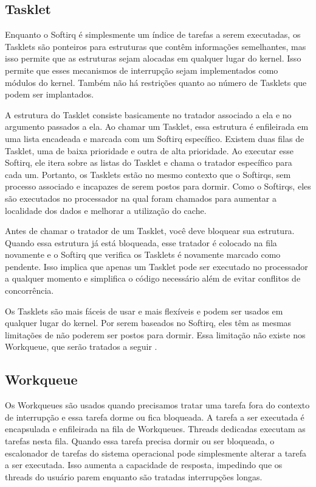 \subsection{Tasklet}

Enquanto o Softirq é simplesmente um índice de tarefas a serem executadas, os Tasklets são ponteiros para estruturas que contêm informações semelhantes, mas isso permite que as estruturas sejam alocadas em qualquer lugar do kernel. Isso permite que esses mecanismos de interrupção sejam implementados como módulos do kernel. Também não há restrições quanto ao número de Tasklets que podem ser implantados.

A estrutura do Tasklet consiste basicamente no tratador associado a ela e no argumento passados a ela. Ao chamar um Tasklet, essa estrutura é enfileirada em uma lista encadeada e marcada com um Softirq específico. Existem duas filas de Tasklet, uma de baixa prioridade e outra de alta prioridade. Ao executar esse Softirq, ele itera sobre as listas do Tasklet e chama o tratador específico para cada um. Portanto, os Tasklets estão no mesmo contexto que o Softirqs, sem processo associado e incapazes de serem postos para dormir. Como o Softirqs, eles são executados no processador na qual foram chamados para aumentar a localidade dos dados e melhorar a utilização do cache.

Antes de chamar o tratador de um Tasklet, você deve bloquear sua estrutura. Quando essa estrutura já está bloqueada, esse tratador é colocado na fila novamente e o Softirq que verifica os Tasklets é novamente marcado como pendente. Isso implica que apenas um Tasklet pode ser executado no processador a qualquer momento e simplifica o código necessário além de evitar conflitos de concorrência.

Os Tasklets são mais fáceis de usar e mais flexíveis e podem ser usados em qualquer lugar do kernel. Por serem baseados no Softirq, eles têm as mesmas limitações de não poderem ser postos para dormir. Essa limitação não existe nos Workqueue, que serão tratados a seguir \cite{OReilly, Rothberg2015}.

\subsection{Workqueue}

Os Workqueues são usados quando precisamos tratar uma tarefa fora do contexto de interrupção e essa tarefa dorme ou fica bloqueada. A tarefa a ser executada é encapsulada e enfileirada na fila de Workqueues. Threads dedicadas executam as tarefas nesta fila. Quando essa tarefa precisa dormir ou ser bloqueada, o escalonador de tarefas do sistema operacional pode simplesmente alterar a tarefa a ser executada. Isso aumenta a capacidade de resposta, impedindo que os threads do usuário parem enquanto são tratadas interrupções longas.

